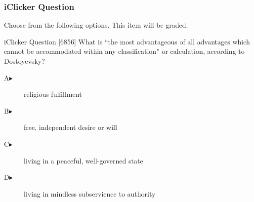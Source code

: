 \begin{frame}
  \frametitle{iClicker Question}
Choose from the following options. This item will be graded.
\begin{block}{iClicker Question}
[6856] What is ``the most advantageous of all advantages which cannot be
accommodated within any classification'' or calculation, according to Dostoyevsky?
\end{block}
\begin{description}
\item[A\hspace{.2in}$\blacktriangleright$] religious fulfillment
\item[B\hspace{.2in}$\blacktriangleright$] free, independent desire or will
\item[C\hspace{.2in}$\blacktriangleright$] living in a peaceful, well-governed state
\item[D\hspace{.2in}$\blacktriangleright$] living in mindless subservience to authority
\end{description}
\end{frame}
